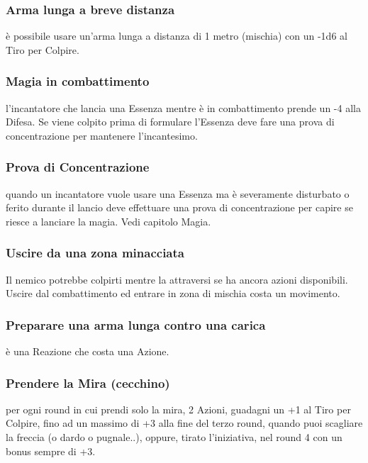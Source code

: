 \documentclass[a4paper,11pt,twoside,openany]{book}
\begin{document}
\subsubsection{Arma lunga a breve distanza} è possibile usare un'arma lunga a distanza di 1 metro (mischia) con un -1d6 al Tiro per Colpire.

\subsubsection{Magia in combattimento} l'incantatore che lancia una Essenza mentre è in combattimento prende un -4 alla Difesa. Se viene colpito prima di formulare l'Essenza deve fare una prova di concentrazione per mantenere l'incantesimo.

\subsubsection{Prova di Concentrazione} quando un incantatore vuole usare una Essenza ma è severamente disturbato o ferito durante il lancio deve effettuare una prova di concentrazione per capire se riesce a lanciare la magia. Vedi capitolo Magia.

\subsubsection{Uscire da una zona minacciata} Il nemico potrebbe colpirti mentre la attraversi se ha ancora azioni disponibili. Uscire dal combattimento ed entrare in zona di mischia costa un movimento.

\subsubsection{Preparare una arma lunga contro una carica} è una Reazione che costa una Azione.

\subsubsection{Prendere la Mira (cecchino)} per ogni round in cui prendi solo la mira, 2 Azioni, guadagni un +1 al Tiro per Colpire, fino ad un massimo di +3 alla fine del terzo round, quando puoi scagliare la freccia (o dardo o pugnale..), oppure, tirato l'iniziativa, nel round 4 con un bonus sempre di +3.
\end{document}
